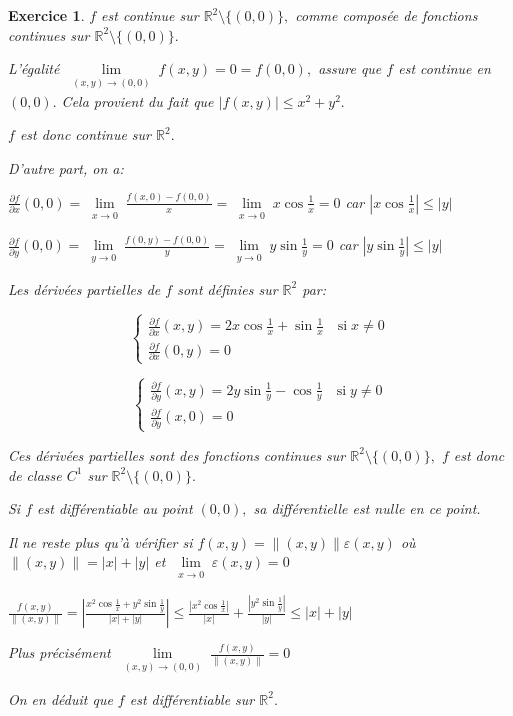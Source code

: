 \documentclass[11pt,a4paper]{report}
\newtheorem{exo}{Exercice}[section]
\begin{document}
\begin{exo}
$f$ est continue sur $\mathbb{R}^2\setminus\{(0,0)\},$ comme composée de fonctions continues sur $\mathbb{R}^2\setminus\{(0,0)\}.$

L'égalité $\lim\limits_{\substack{(x,y)\rightarrow(0,0)}}f(x,y)=0=f(0,0),$ assure que $f$ est continue en $(0,0).$ Cela provient du fait que $|f(x,y)|\leq x^2+y^2.$

$f$ est donc continue sur $\mathbb{R}^2.$

D'autre part, on a:

$\frac{\partial f}{\partial x}(0,0)=\lim\limits_{\substack{x\rightarrow0}}\frac{f(x,0)-f(0,0)}{x}=\lim\limits_{\substack{x\rightarrow0}}x\cos \frac{1}{x}=0$ car $|x\cos\frac{1}{x}|\leq |y|$

$\frac{\partial f}{\partial y}(0,0)=\lim\limits_{\substack{y\rightarrow0}}\frac{f(0,y)-f(0,0)}{y}=\lim\limits_{\substack{y\rightarrow0}}y\sin \frac{1}{y}=0$
 car $|y\sin\frac{1}{y}|\leq |y|$

 Les dérivées partielles de $f$ sont définies sur $\mathbb{R}^2$ par:

$$\begin{cases}
\frac{\partial f}{\partial x}(x,y)=2x\cos\frac{1}{x}+\sin\frac{1}{x}\quad\mbox{si}\;x\neq0 \\
\frac{\partial f}{\partial x}(0,y)=0 \;
\end{cases}$$

$$\begin{cases}
\frac{\partial f}{\partial y}(x,y)=2y\sin\frac{1}{y}-\cos\frac{1}{y}\quad\mbox{si}\;y\neq0 \\
\frac{\partial f}{\partial y}(x,0)=0 \;
\end{cases}$$

Ces dérivées partielles sont des fonctions continues sur $\mathbb{R}^2\setminus\{(0,0)\},$ $f$ est donc de classe $C^1$ sur $\mathbb{R}^2\setminus\{(0,0)\}.$

Si $f$ est différentiable au point $(0,0),$ sa différentielle est nulle en ce point.

Il ne reste plus qu'à vérifier si $f(x,y)=\|(x,y)\|\varepsilon(x,y)$ où $\|(x,y)\|=|x|+|y|$ et $\lim\limits_{\substack{x\rightarrow0}}\varepsilon(x,y)=0$

$\frac{f(x,y)}{\|(x,y)\|}=|\frac{x^2\cos\frac{1}{x}+y^2\sin\frac{1}{y}}{|x|+|y|}|\leq\frac{|x^2 \cos\frac{1}{x}|}{|x|}+\frac{|y^2\sin \frac{1}{y}|}{|y|}\leq |x|+|y|$

Plus précisément $\lim\limits_{\substack{(x,y)\rightarrow(0,0)}}\frac{f(x,y)}{\|(x,y)\|}=0$

On en déduit que $f$ est différentiable sur $\mathbb{R}^2.$
\end{exo}
\end{document}
